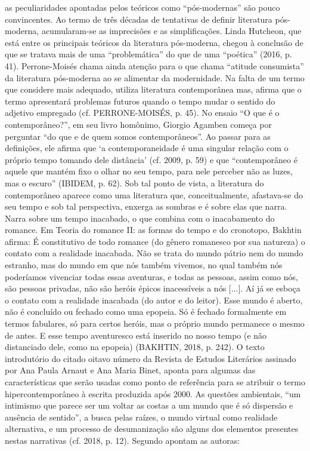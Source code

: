 \documentclass[../DISSERTACAO_MAIN.tex]{subfiles}
\begin{document}
as peculiaridades apontadas pelos teóricos como “pós-modernas” são pouco convincentes. Ao termo de três décadas de tentativas de definir literatura pós-moderna, acumularam-se as imprecisões e as simplificações. Linda Hutcheon, que está entre os principais teóricos da literatura pós-moderna, chegou à conclusão de que se tratava mais de uma “problemática” do que de uma “poética” (2016, p. 41).
Perrone-Moisés chama ainda atenção para o que chama “atitude consumista” da literatura pós-moderna ao se alimentar da modernidade. Na falta de um termo que considere mais adequado, utiliza literatura contemporânea mas, afirma que o termo apresentará problemas futuros quando o tempo mudar o sentido do adjetivo empregado (cf. PERRONE-MOISÉS, p. 45).
No ensaio “O que é o contemporâneo?”, em seu livro homônimo, Giorgio Agamben começa por perguntar “do que e de quem somos contemporâneos”. Ao passar para as definições, ele afirma que ‘a contemporaneidade é uma singular relação com o próprio tempo tomando dele distância’ (cf. 2009, p. 59) e que “contemporâneo é aquele que mantém fixo o olhar no seu tempo, para nele perceber não as luzes, mas o escuro” (IBIDEM, p. 62). Sob tal ponto de vista, a literatura do contemporâneo aparece como uma literatura que, conceitualmente, afastava-se do seu tempo e sob tal perspectiva, enxerga as sombras e é sobre elas que narra. Narra sobre um tempo inacabado, o que combina com o inacabamento do romance. Em Teoria do romance II: as formas do tempo e do cronotopo, Bakhtin afirma:
É constitutivo de todo romance (do gênero romanesco por sua natureza) o contato com a realidade inacabada. Não se trata do mundo pátrio nem do mundo estranho, mas do mundo em que nós também vivemos, no qual também nós poderíamos vivenciar todas essas aventuras, e todas as pessoas, assim como nós, são pessoas privadas, não são heróis épicos inacessíveis a nós [...]. Aí já se esboça o contato com a realidade inacabada (do autor e do leitor). Esse mundo é aberto, não é concluído ou fechado como uma epopeia. Só é fechado formalmente em termos fabulares, só para certos heróis, mas o próprio mundo permanece o mesmo de antes. E esse tempo aventuresco está inserido no nosso tempo (e não distanciado dele, como na epopeia) (BAKHTIN, 2018, p. 242).
O texto introdutório do citado oitavo número da Revista de Estudos Literários assinado por Ana Paula Arnaut e Ana Maria Binet, aponta para algumas das características que serão usadas como ponto de referência para se atribuir o termo hipercontemporâneo à escrita produzida após 2000. As questões ambientais, “um intimismo que parece ser um voltar as costas a um mundo que é só dispersão e ausência de sentido”, a busca pelas raízes, o mundo virtual como realidade alternativa, e um processo de desumanização são alguns dos elementos presentes nestas narrativas (cf. 2018, p. 12). Segundo apontam as autoras: 
\end{document}
